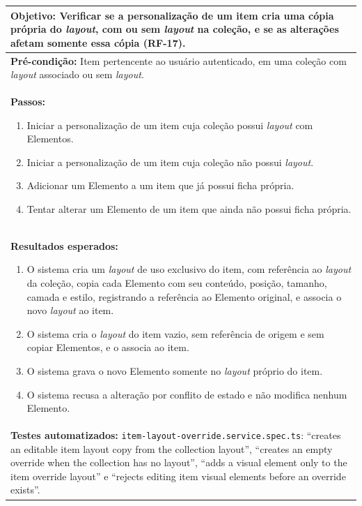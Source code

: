 \begin{quadro}[h!]
\caption{Caso de teste CT05: validar a criação da ficha própria de um item}
\label{quad:ct05}
\begin{tabular}{|p{\dimexpr\linewidth-2\tabcolsep-2\arrayrulewidth\relax}|}
\hline
\textbf{Objetivo:} Verificar se a personalização de um item cria uma cópia própria do \textit{layout}, com ou sem \textit{layout} na coleção, e se as alterações afetam somente essa cópia (RF-17). \\ \hline
\textbf{Pré-condição:} Item pertencente ao usuário autenticado, em uma coleção com \textit{layout} associado ou sem \textit{layout}. \\ \hline
\textbf{Passos:}
\begin{enumerate}[nosep,leftmargin=1.2em,topsep=2pt,partopsep=0pt,parsep=0pt,itemsep=1pt]
  \item Iniciar a personalização de um item cuja coleção possui \textit{layout} com Elementos.
  \item Iniciar a personalização de um item cuja coleção não possui \textit{layout}.
  \item Adicionar um Elemento a um item que já possui ficha própria.
  \item Tentar alterar um Elemento de um item que ainda não possui ficha própria.
\end{enumerate} \\ \hline
\textbf{Resultados esperados:}
\begin{enumerate}[nosep,leftmargin=1.2em,topsep=2pt,partopsep=0pt,parsep=0pt,itemsep=1pt]
  \item O sistema cria um \textit{layout} de uso exclusivo do item, com referência ao \textit{layout} da coleção, copia cada Elemento com seu conteúdo, posição, tamanho, camada e estilo, registrando a referência ao Elemento original, e associa o novo \textit{layout} ao item.
  \item O sistema cria o \textit{layout} do item vazio, sem referência de origem e sem copiar Elementos, e o associa ao item.
  \item O sistema grava o novo Elemento somente no \textit{layout} próprio do item.
  \item O sistema recusa a alteração por conflito de estado e não modifica nenhum Elemento.
\end{enumerate} \\ \hline
\textbf{Testes automatizados:} \texttt{item-layout-override.service.spec.ts}: ``creates an editable item layout copy from the collection layout'', ``creates an empty override when the collection has no layout'', ``adds a visual element only to the item override layout'' e ``rejects editing item visual elements before an override exists''. \\ \hline
\end{tabular}
\end{quadro}

